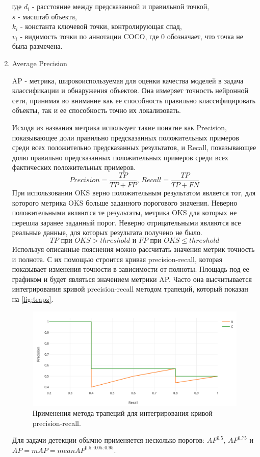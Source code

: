 \begin{enumerate}
где $d_i$ - расстояние между предсказанной и правильной точкой,\\
$s$ - масштаб объекта,\\
$k_i$ - константа ключевой точки, контролирующая спад,\\
$v_i$ - видимость точки по аннотации COCO, где 0 обозначает, что точка не была размечена.

\item Average Precision

AP - метрика, широкоиспользуемая для оценки качества моделей в задача классификации и обнаружения объектов. Она измеряет точность нейронной сети, принимая во внимание как ее способность правильно классифицировать объекты, так и ее способность точно их локализовать.

Исходя из названия метрика использует такие понятие как Precision, показывающее доли правильно предсказанных положительных примеров среди всех положительно предсказанных результатов, и Recall, показывающее долю правильно предсказанных положительных примеров среди всех фактических положительных примеров.
$$
Precision = \frac{TP}{TP + FP} \text{, } Recall = \frac{TP}{TP + FN}
$$
При использовании OKS верно положительным результатом является тот, для которого метрика OKS больше заданного порогового значения. Неверно положительными являются те результаты, метрика OKS для которых не перешла заранее заданный порог. Неверно отрицательными являются все реальные данные, для которых результата получено не было.
$$
TP\text{ при }OKS > threshold\text{ и }FP\text{ при }OKS \leq threshold
$$
Используя описанные пояснения можно рассчитать значения метрик точность и полнота. С их помощью строится кривая precision-recall, которая показывает изменения точности в зависимости от полноты. Площадь под ее графиком и будет являться значением метрики AP. Часто она высчитывается интегрирования кривой precision-recall методом трапеций, который показан на \autoref{fig:trapz}.

\begin{figure}[h]
	\centering
	\includegraphics[width=.75\textwidth]{./images/experiment/AP}
	\caption{Применения метода трапеций для интегрирования кривой precision-recall.}
	\label{fig:trapz}
\end{figure}

Для задачи детекции обычно применяется несколько порогов: $AP^{0.5}$, $AP^{0.75}$ и $AP = mAP = mean AP^{0.5:0.05:0.95}$.

\end{enumerate}

